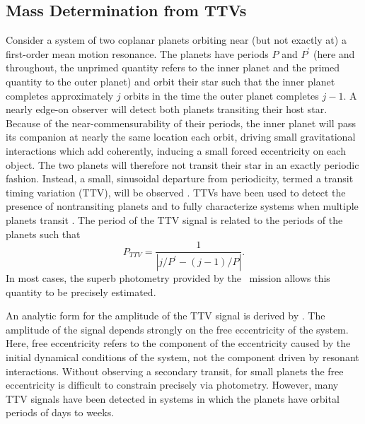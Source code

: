 \subsection{Mass Determination from TTVs}

Consider a system of two coplanar planets orbiting near (but not exactly at) a first-order mean motion resonance. The planets have periods $P$ and $P^\prime$ (here and throughout, the unprimed quantity refers to the inner planet and the primed quantity to the outer planet) and orbit their star such that the inner planet completes approximately $j$ orbits in the time the outer planet completes $j-1$. A nearly edge-on observer will detect both planets transiting their host star. Because of the near-commensurability of their periods, the inner planet will pass its companion at nearly the same location each orbit, driving small gravitational interactions which add coherently, inducing a small forced eccentricity on each object. The two planets will therefore not transit their star in an exactly periodic fashion. Instead, a small, sinusoidal departure from periodicity, termed a transit timing variation (TTV), will be observed \citep[e.g.][]{Nesvorny12}. TTVs have been used to detect the presence of nontransiting planets \citep{Ballard11, Dawson12b} and to fully characterize systems when multiple planets transit \citep{Holman10, Lissauer11a}. The period of the TTV signal is related to the periods of the planets such that
\begin{equation}
P_{TTV} = \frac{1}{|j / P^\prime - (j-1) / P|}.
\end{equation}
In most cases, the superb photometry provided by the \kep\ mission allows this quantity to be precisely estimated. 

An analytic form for the amplitude of the TTV signal is derived by \citet[hereafter L12]{Lithwick12}. The amplitude of the signal depends strongly on the free eccentricity of the system. Here, free eccentricity refers to the component of the eccentricity caused by the initial dynamical conditions of the system, not the component driven by resonant interactions. Without observing a secondary transit, for small planets the free eccentricity is difficult to constrain precisely via photometry. However, many TTV signals have been detected in systems in which the planets have orbital periods of days to weeks. 

